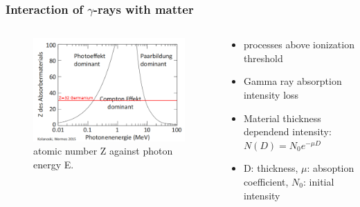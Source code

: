 \documentclass[aspectratio=1610, 12pt]{beamer}
\begin{document}
\begin{frame}\frametitle{Interaction of $\gamma$-rays with matter}
  \begin{columns}
    \begin{column}[c]{0.48\textwidth}
      \begin{figure}
        \includegraphics[width=\textwidth]{plots/z_depend.png}
        \caption{atomic number Z against photon energy E.}
      \end{figure}
    \end{column}
    \begin{column}[c]{0.48\textwidth}
      \begin{itemize}
        \item processes above ionization threshold
        \item Gamma ray absorption \to intensity loss
        \item Material thickness dependend intensity: $N(D) = N_0 e^{-\mu D}$
        \item D: thickness, $\mu$: absoption coefficient, $N_0$: initial intensity
      \end{itemize}
    \end{column}
  \end{columns}
\end{frame}
\end{document}
